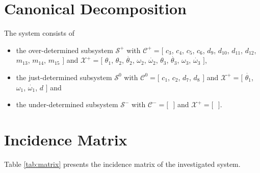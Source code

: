 \documentclass[a4,11pt]{article}
\begin{document}
\section{Canonical Decomposition}The system consists of
\begin{itemize}	\item the over-determined subsystem $\mathcal{S}^+$ with $\mathcal{C}^+ = [$ $c_3$, $c_4$, $c_5$, $c_6$, $d_9$, $d_10$, $d_11$, $d_12$, $m_13$, $m_14$, $m_15 $ $]$ and $\mathcal{X}^+ = [$ $\theta_1$, $\theta_2$, $\dot{\theta_2}$, $\omega_2$, $\dot{\omega_2}$, $\theta_3$, $\dot{\theta_3}$, $\omega_3$, $\dot{\omega_3} $ $]$,
	\item the just-determined subsystem $\mathcal{S}^0$ with $\mathcal{C}^0 = [$ $c_1$, $c_2$, $d_7$, $d_8 $ $]$ and $\mathcal{X}^+ = [$ $\dot{\theta_1}$, $\omega_1$, $\dot{\omega_1}$, $d $ $]$ and
	\item the under-determined subsystem $\mathcal{S}^-$ with $\mathcal{C}^- = [$ $ $ $]$ and $\mathcal{X}^+ = [$ $ $ $]$.
\end{itemize}
\section{Incidence Matrix}
Table \ref{tab:matrix} presents the incidence matrix of the investigated system.\setlength\tabcolsep{2mm}
\end{document}
